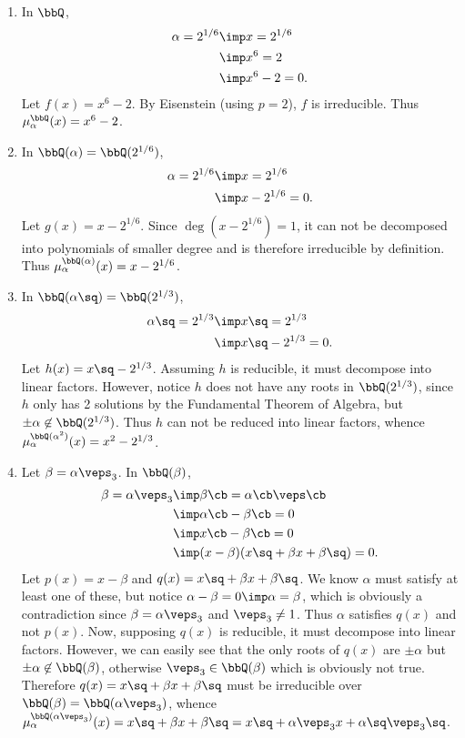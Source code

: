 \documentclass{article}
\begin{document}
\begin{solution}
\begin{enumerate}[label=\alph*)]
\item In $ \bbQ $, \begin{align*}
  \alpha = 2^{1/6} &\imp x = 2^{1/6}\\
  &\imp x^6 = 2 \\
  &\imp x^6 - 2 = 0.
\end{align*}
Let $ f(x) = x^6-2 $.
By Eisenstein (using $ p=2 $), $ f $ is irreducible.
Thus $ \mu_\alpha^\bbQ (x) = x^6 - 2 $.

\item In $ \bbQ(\alpha)=\bbQ(2^{1/6}) $, \begin{align*}
  \alpha = 2^{1/6} &\imp x=2^{1/6} \\
  &\imp x - 2^{1/6} = 0.
\end{align*}
Let $ g(x) = x-2^{1/6} $.
Since $ \deg(x-2^{1/6}) = 1 $, it can not be decomposed into  polynomials of smaller degree and is therefore irreducible by definition.
Thus $ \mu_\alpha^{\bbQ(\alpha)} (x) = x - 2^{1/6} $.

\item In $ \bbQ(\alpha\sq)=\bbQ(2^{1/3}) $, \begin{align*}
  \alpha\sq = 2^{1/3} &\imp x\sq = 2^{1/3} \\
  &\imp x\sq - 2^{1/3} = 0.
\end{align*}
Let $ h(x) = x\sq-2^{1/3} $. Assuming $ h $ is reducible, it must decompose into linear factors.
However, notice $ h $ does not have any roots in $ \bbQ(2^{1/3}) $, since $ h $ only has 2 solutions by the Fundamental Theorem of Algebra, but $ \pm\alpha\not\in \bbQ(2^{1/3}) $.
Thus $ h $ can not be reduced into linear factors, whence $ \mu_\alpha^{\bbQ(\alpha^2)}(x) = x^2-2^{1/3} $.

\item Let $ \beta=\alpha\veps_3 $. In $ \bbQ(\beta) $, \begin{align*}
  \beta = \alpha\veps_3 &\imp \beta\cb = \alpha\cb \veps\cb \\
  &\imp \alpha\cb - \beta\cb = 0 \\
  &\imp x\cb - \beta\cb = 0 \\
  &\imp (x-\beta)(x\sq+\beta x + \beta\sq) = 0.
\end{align*}
Let $ p(x) = x-\beta $ and $ q(x) = x\sq+\beta x + \beta\sq $.
We know $ \alpha $ must satisfy at least one of these, but notice $ \alpha-\beta = 0 \imp \alpha = \beta $, which is obviously a contradiction since $ \beta=\alpha\veps_3 $ and $ \veps_3 \neq 1 $.
Thus $ \alpha $ satisfies $ q(x) $ and not $ p(x) $. Now, supposing $ q(x) $ is reducible, it must decompose into linear factors.
However, we can easily see that the only roots of $ q(x) $ are $ \pm \alpha$ but $ \pm\alpha\not\in \bbQ(\beta) $, otherwise $ \veps_3 \in \bbQ(\beta) $ which is obviously not true.
Therefore $ q(x) =  x\sq+\beta x + \beta\sq $ must be irreducible over $ \bbQ(\beta) = \bbQ(\alpha\veps_3) $, whence $ \mu_\alpha^{\bbQ(\alpha\veps_3)}(x) =  x\sq+\beta x + \beta\sq = x\sq+\alpha\veps_3x + \alpha\sq\veps_3\sq$.
\end{enumerate}
\end{solution}
\end{document}
